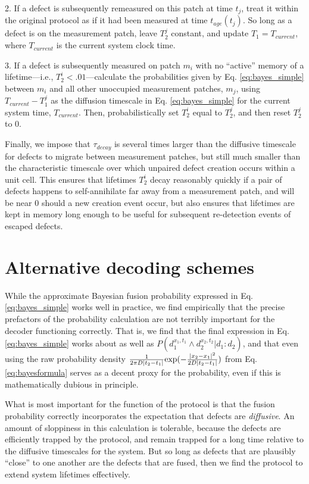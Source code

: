 \documentclass[twocolumn,superscriptaddress,aps,prb,floatfix]{revtex4-1}
\renewcommand*{\emph}[1]{{\it {#1}}}
\begin{document}
2. If a defect is subsequently remeasured on this patch at time $t_j$, treat it within the original protocol as if it had been measured at time $t_{age}(t_j)$.  So long as a defect is on the measurement patch, leave $T^j_2$ constant, and update $T_1 = T_{current}$, where $T_{current}$ is the current system clock time.

3. If a defect is subsequently measured on patch $m_i$ with no ``active'' memory of a lifetime---i.e., $T^i_2<.01$---calculate the probabilities given by Eq. \ref{eq:bayes_simple} between $m_i$ and all other unoccupied measurement patches, $m_j$, using $T_{current} - T^j_1$ as the diffusion timescale in Eq. \ref{eq:bayes_simple} for the current system time, $T_{current}$.  Then, probabilistically set $T^i_2$ equal to $T^j_2$, and then reset $T^j_2$ to $0$.

Finally, we impose that $\tau_{decay}$ is several times larger than the diffusive timescale for defects to migrate between measurement patches, but still much smaller than the characteristic timescale over which unpaired defect creation occurs within a unit cell.  This ensures that lifetimes $T^i_2$ decay reasonably quickly if a pair of defects happens to self-annihilate far away from a measurement patch, and will be near $0$ should a new creation event occur, but also ensures that lifetimes are kept in memory long enough to be useful for subsequent re-detection events of escaped defects.


\section{Alternative decoding schemes}
\label{sec:appendix_alt_decode_scheme}

While the approximate Bayesian fusion probability expressed in Eq. \ref{eq:bayes_simple} works well in practice, we find empirically that the precise prefactors of the probability calculation are not terribly important for the decoder functioning correctly.  That is, we find that the final expression in Eq. \ref{eq:bayes_simple} works about as well as $P(d_1^{x_1,t_1} \wedge d_2^{x_2,t_2} | d_1:d_2)$, and that even using the raw probability density $\frac{1}{2\pi D |t_2-t_1|} {\rm exp}(-\frac{|x_2-x_1|^2}{2 D |t_2-t_1|})$ from Eq. \ref{eq:bayesformula} serves as a decent proxy for the probability, even if this is mathematically dubious in principle.

What is most important for the function of the protocol is that the fusion probability correctly incorporates the expectation that defects are \emph{diffusive}. An amount of sloppiness in this calculation is tolerable, because the defects are efficiently trapped by the protocol, and remain trapped for a long time relative to the diffusive timescales for the system.  But so long as defects that are plausibly ``close'' to one another are the defects that are fused, then we find the protocol to extend system lifetimes effectively.
\end{document}
